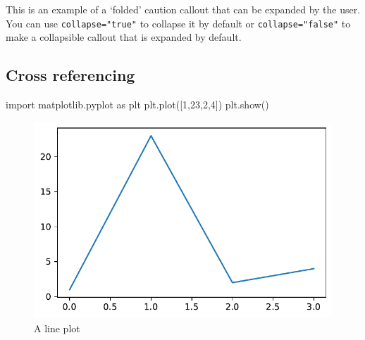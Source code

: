 \documentclass[
  letterpaper,
  DIV=11,
  numbers=noendperiod,
  oneside]{scrartcl}
\newenvironment{Shaded}{\begin{snugshade}}{\end{snugshade}}
\newcommand{\DecValTok}[1]{\textcolor[rgb]{0.68,0.00,0.00}{#1}}
\newcommand{\ImportTok}[1]{\textcolor[rgb]{0.00,0.46,0.62}{#1}}
\newcommand{\NormalTok}[1]{\textcolor[rgb]{0.00,0.23,0.31}{#1}}
\begin{document}
\begin{tcolorbox}[enhanced jigsaw, opacitybacktitle=0.6, toprule=.15mm, arc=.35mm, opacityback=0, bottomrule=.15mm, coltitle=black, colbacktitle=quarto-callout-caution-color!10!white, breakable, title=\textcolor{quarto-callout-caution-color}{\faFire}\hspace{0.5em}{Expand To Learn About Collapse}, colframe=quarto-callout-caution-color-frame, left=2mm, colback=white, leftrule=.75mm, bottomtitle=1mm, toptitle=1mm, titlerule=0mm, rightrule=.15mm]

This is an example of a `folded' caution callout that can be expanded by
the user. You can use \texttt{collapse="true"} to collapse it by default
or \texttt{collapse="false"} to make a collapsible callout that is
expanded by default.

\end{tcolorbox}

\hypertarget{cross-referencing}{%
\subsection{Cross referencing}\label{cross-referencing}}

\begin{Shaded}
\begin{Highlighting}[]
\ImportTok{import}\NormalTok{ matplotlib.pyplot }\ImportTok{as}\NormalTok{ plt}
\NormalTok{plt.plot([}\DecValTok{1}\NormalTok{,}\DecValTok{23}\NormalTok{,}\DecValTok{2}\NormalTok{,}\DecValTok{4}\NormalTok{])}
\NormalTok{plt.show()}
\end{Highlighting}
\end{Shaded}

\begin{figure}[H]

{\centering \includegraphics{start-with-quarto_files/figure-pdf/fig-line-plot-output-1.pdf}

}

\caption{\label{fig-line-plot}A line plot}

\end{figure}
\end{document}
